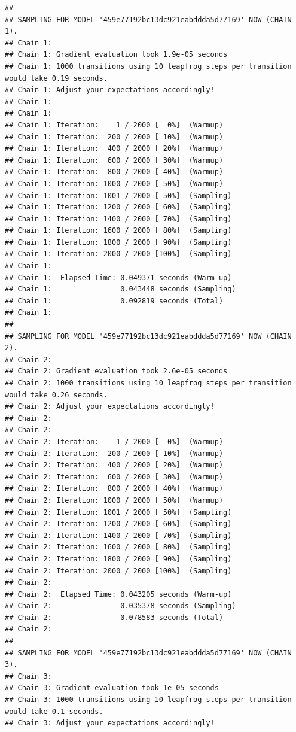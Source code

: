 \documentclass[
]{article}
\begin{document}
\begin{verbatim}
## 
## SAMPLING FOR MODEL '459e77192bc13dc921eabddda5d77169' NOW (CHAIN 1).
## Chain 1: 
## Chain 1: Gradient evaluation took 1.9e-05 seconds
## Chain 1: 1000 transitions using 10 leapfrog steps per transition would take 0.19 seconds.
## Chain 1: Adjust your expectations accordingly!
## Chain 1: 
## Chain 1: 
## Chain 1: Iteration:    1 / 2000 [  0%]  (Warmup)
## Chain 1: Iteration:  200 / 2000 [ 10%]  (Warmup)
## Chain 1: Iteration:  400 / 2000 [ 20%]  (Warmup)
## Chain 1: Iteration:  600 / 2000 [ 30%]  (Warmup)
## Chain 1: Iteration:  800 / 2000 [ 40%]  (Warmup)
## Chain 1: Iteration: 1000 / 2000 [ 50%]  (Warmup)
## Chain 1: Iteration: 1001 / 2000 [ 50%]  (Sampling)
## Chain 1: Iteration: 1200 / 2000 [ 60%]  (Sampling)
## Chain 1: Iteration: 1400 / 2000 [ 70%]  (Sampling)
## Chain 1: Iteration: 1600 / 2000 [ 80%]  (Sampling)
## Chain 1: Iteration: 1800 / 2000 [ 90%]  (Sampling)
## Chain 1: Iteration: 2000 / 2000 [100%]  (Sampling)
## Chain 1: 
## Chain 1:  Elapsed Time: 0.049371 seconds (Warm-up)
## Chain 1:                0.043448 seconds (Sampling)
## Chain 1:                0.092819 seconds (Total)
## Chain 1: 
## 
## SAMPLING FOR MODEL '459e77192bc13dc921eabddda5d77169' NOW (CHAIN 2).
## Chain 2: 
## Chain 2: Gradient evaluation took 2.6e-05 seconds
## Chain 2: 1000 transitions using 10 leapfrog steps per transition would take 0.26 seconds.
## Chain 2: Adjust your expectations accordingly!
## Chain 2: 
## Chain 2: 
## Chain 2: Iteration:    1 / 2000 [  0%]  (Warmup)
## Chain 2: Iteration:  200 / 2000 [ 10%]  (Warmup)
## Chain 2: Iteration:  400 / 2000 [ 20%]  (Warmup)
## Chain 2: Iteration:  600 / 2000 [ 30%]  (Warmup)
## Chain 2: Iteration:  800 / 2000 [ 40%]  (Warmup)
## Chain 2: Iteration: 1000 / 2000 [ 50%]  (Warmup)
## Chain 2: Iteration: 1001 / 2000 [ 50%]  (Sampling)
## Chain 2: Iteration: 1200 / 2000 [ 60%]  (Sampling)
## Chain 2: Iteration: 1400 / 2000 [ 70%]  (Sampling)
## Chain 2: Iteration: 1600 / 2000 [ 80%]  (Sampling)
## Chain 2: Iteration: 1800 / 2000 [ 90%]  (Sampling)
## Chain 2: Iteration: 2000 / 2000 [100%]  (Sampling)
## Chain 2: 
## Chain 2:  Elapsed Time: 0.043205 seconds (Warm-up)
## Chain 2:                0.035378 seconds (Sampling)
## Chain 2:                0.078583 seconds (Total)
## Chain 2: 
## 
## SAMPLING FOR MODEL '459e77192bc13dc921eabddda5d77169' NOW (CHAIN 3).
## Chain 3: 
## Chain 3: Gradient evaluation took 1e-05 seconds
## Chain 3: 1000 transitions using 10 leapfrog steps per transition would take 0.1 seconds.
## Chain 3: Adjust your expectations accordingly!

\end{verbatim}
\end{document}

